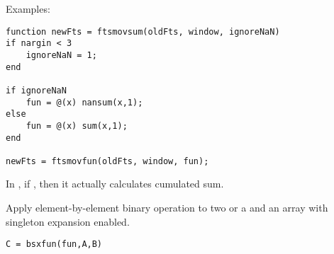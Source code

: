 \noindent Examples:
   \begin{lstlisting}
function newFts = ftsmovsum(oldFts, window, ignoreNaN)
if nargin < 3
    ignoreNaN = 1;
end

if ignoreNaN
    fun = @(x) nansum(x,1);
else
    fun = @(x) sum(x,1);
end

newFts = ftsmovfun(oldFts, window, fun);
   \end{lstlisting}

In , if , then it actually calculates
cumulated sum.
 
  Apply element-by-element binary operation to two  or
  a  and an array with singleton expansion enabled.

\usage
   \begin{lstlisting}[numbers=none]
   C = bsxfun(fun,A,B)
   \end{lstlisting}

